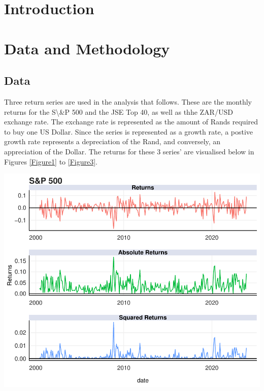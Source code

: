 \documentclass[11pt,preprint, authoryear]{elsarticle}
\let\origfigure\figure
\let\endorigfigure\endfigure
\renewenvironment{figure}[1][2] {
    \expandafter\origfigure\expandafter[H]
} {
    \endorigfigure
}
\numberwithin{equation}{section}
\numberwithin{figure}{section}
\numberwithin{table}{section}
\begin{document}
\headsep 35pt %




\hypertarget{introduction}{%
\section{\texorpdfstring{Introduction
\label{Introduction}}{Introduction }}\label{introduction}}

\hypertarget{data-and-methodology}{%
\section{Data and Methodology}\label{data-and-methodology}}

\hypertarget{data}{%
\subsection{Data}\label{data}}

Three return series are used in the analysis that follows. These are the
monthly returns for the S\textbackslash\&P 500 and the JSE Top 40, as
well as thhe ZAR/USD exchange rate. The exchange rate is represented as
the amount of Rands required to buy one US Dollar. Since the series is
represented as a growth rate, a postive growth rate represents a
depreciation of the Rand, and conversely, an appreciation of the Dollar.
The returns for these 3 series' are visualised below in Figures
\ref{Figure1} to \ref{Figure3}.

\begin{figure}[H]

{\centering \includegraphics{Template_files/figure-latex/Figure1-1} 

}

\caption{S\&P 500 Returns \label{Figure1}}\label{fig:Figure1}
\end{figure}
\end{document}
